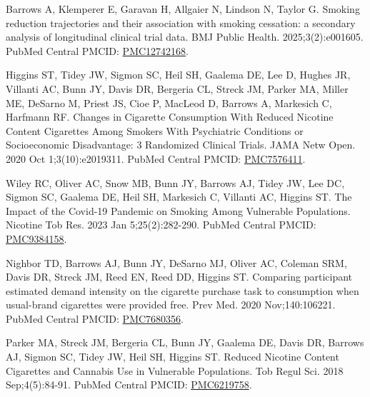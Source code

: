 \documentclass{nihbiosketch}
\begin{document}
\begin{products}
	\item Barrows A, Klemperer E, Garavan H, Allgaier N, Lindson N, Taylor G. Smoking reduction trajectories and their association with smoking cessation: a secondary analysis of longitudinal clinical trial data. BMJ Public Health. 2025;3(2):e001605. PubMed Central PMCID: \href{https://pmc.ncbi.nlm.nih.gov/articles/PMC12742168/}{PMC12742168}.
	\item Higgins ST, Tidey JW, Sigmon SC, Heil SH, Gaalema DE, Lee D, Hughes JR, Villanti AC, Bunn JY, Davis DR, Bergeria CL, Streck JM, Parker MA, Miller ME, DeSarno M, Priest JS, Cioe P, MacLeod D, Barrows A, Markesich C, Harfmann RF. Changes in Cigarette Consumption With Reduced Nicotine Content Cigarettes Among Smokers With Psychiatric Conditions or Socioeconomic Disadvantage: 3 Randomized Clinical Trials. JAMA Netw Open. 2020 Oct 1;3(10):e2019311. PubMed Central PMCID: \href{https://pmc.ncbi.nlm.nih.gov/articles/PMC7576411/}{PMC7576411}.
	\item Wiley RC, Oliver AC, Snow MB, Bunn JY, Barrows AJ, Tidey JW, Lee DC, Sigmon SC, Gaalema DE, Heil SH, Markesich C, Villanti AC, Higgins ST. The Impact of the Covid-19 Pandemic on Smoking Among Vulnerable Populations. Nicotine Tob Res. 2023 Jan 5;25(2):282-290. PubMed Central PMCID: \href{https://pmc.ncbi.nlm.nih.gov/articles/PMC9384158/}{PMC9384158}.
	\item Nighbor TD, Barrows AJ, Bunn JY, DeSarno MJ, Oliver AC, Coleman SRM, Davis DR, Streck JM, Reed EN, Reed DD, Higgins ST. Comparing participant estimated demand intensity on the cigarette purchase task to consumption when usual-brand cigarettes were provided free. Prev Med. 2020 Nov;140:106221. PubMed Central PMCID: \href{https://pmc.ncbi.nlm.nih.gov/articles/PMC7680356/}{PMC7680356}.
	\item Parker MA, Streck JM, Bergeria CL, Bunn JY, Gaalema DE, Davis DR, Barrows AJ, Sigmon SC, Tidey JW, Heil SH, Higgins ST. Reduced Nicotine Content Cigarettes and Cannabis Use in Vulnerable Populations. Tob Regul Sci. 2018 Sep;4(5):84-91. PubMed Central PMCID: \href{https://pmc.ncbi.nlm.nih.gov/articles/PMC6219758/}{PMC6219758}.
\end{products}

\certification

\supplement
\end{document}
